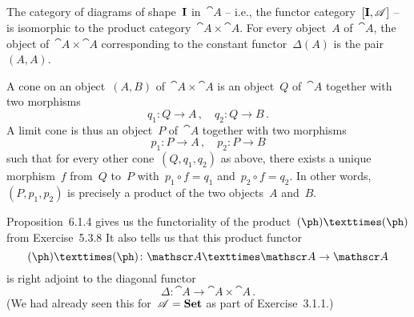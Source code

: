 \subsection{}

The category of diagrams of shape~$\mathbf{I}$ in~$\cat{A}$ -- i.e., the functor category~$[\mathbf{I}, \mathscr{A}]$ -- is isomorphic to the product category~$\cat{A} × \cat{A}$.
For every object~$A$ of~$\cat{A}$, the object of~$\cat{A} × \cat{A}$ corresponding to the constant functor~$Δ(A)$ is the pair~$(A, A)$.

A cone on an object~$(A, B)$ of~$\cat{A} × \cat{A}$ is an object~$Q$ of~$\cat{A}$ together with two morphisms
\[
	q_1 \colon Q \to A \,,
	\quad
	q_2 \colon Q \to B \,.
\]
A limit cone is thus an object~$P$ of~$\cat{A}$ together with two morphisms
\[
	p_1 \colon P \to A \,,
	\quad
	p_2 \colon P \to B
\]
such that for every other cone~$(Q, q_1, q_2)$ as above, there exists a unique morphism~$f$ from~$Q$ to~$P$ with~$p_1 ∘ f = q_1$ and~$p_2 ∘ f = q_2$.
In other words,~$(P, p_1, p_2)$ is precisely a product of the two objects~$A$ and~$B$.

Proposition~6.1.4 gives us the functoriality of the product~$(\ph) × (\ph)$ from Exercise~5.3.8
It also tells us that this product functor
\[
	(\ph) × (\ph) \colon \cat{A} × \cat{A} \to \cat{A}
\]
is right adjoint to the diagonal functor
\[
	Δ \colon \cat{A} \to \cat{A} × \cat{A} \,.
\]
(We had already seen this for~$\mathscr{A} = \mathbf{Set}$ as part of Exercise~3.1.1.)

